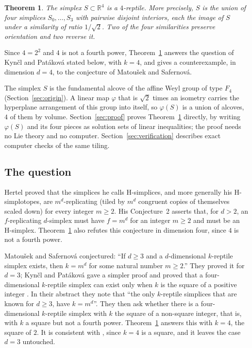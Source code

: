 \documentclass[11pt]{article}
\newtheorem{theorem}{Theorem}
\theoremstyle{remark}
\begin{document}
\begin{theorem}\label{thm:main}
The simplex $S\subset\mathbb{R}^4$ is a $4$-reptile. More precisely, $S$
is the union of four simplices $S_0,\dots,S_3$ with pairwise disjoint
interiors, each the image of $S$ under a similarity of ratio $1/\sqrt2$.
Two of the four similarities preserve orientation and two reverse it.
\end{theorem}

Since $4=2^2$ and $4$ is not a fourth power, Theorem~\ref{thm:main}
answers the question of Kynčl and Patáková stated below, with $k=4$, and
gives a counterexample, in dimension $d=4$, to the conjecture of Matoušek
and Safernová.

The simplex $S$ is the fundamental alcove of the affine Weyl group of type
$F_4$ (Section~\ref{sec:origin}). A linear map $\varphi$ that is $\sqrt2$
times an isometry carries the hyperplane arrangement of this group into
itself, so $\varphi(S)$ is a union of alcoves, $4$ of them by volume.
Section~\ref{sec:proof} proves Theorem~\ref{thm:main} directly, by
writing $\varphi(S)$ and its four pieces as solution sets of linear
inequalities; the proof needs no Lie theory and no computer.
Section~\ref{sec:verification} describes exact computer checks of the
same tiling.

\subsection{The question}
Hertel \cite[pp.~650--652]{He} proved that the simplices he calls
H-simplices, and more generally his H-simplotopes, are $m^d$-replicating
(tiled by $m^d$ congruent copies of themselves scaled down) for every
integer $m\ge2$. His Conjecture~2 \cite[p.~652]{He} asserts that, for
$d>2$, an $f$-replicating $d$-simplex must have $f=m^d$ for an integer
$m\ge2$ and must be an H-simplex. Theorem~\ref{thm:main} also refutes this
conjecture in dimension four, since $4$ is not a fourth power.

Matoušek and Safernová \cite[Conjecture~1.2]{MS} conjectured: ``If $d\ge3$
and a $d$-dimensional $k$-reptile simplex exists, then $k=m^d$ for some
natural number $m\ge2$.'' They proved it for $d=3$; Kynčl and Patáková
gave a simpler proof \cite[Theorem~1.2]{KP} and proved that a
four-dimensional $k$-reptile simplex can exist only when $k$ is the square
of a positive integer \cite[Theorem~1.3]{KP}. In
their abstract they note that ``the only $k$-reptile simplices that are
known for $d\geqslant3$, have $k=m^d$''. They then ask \cite[Problem~1.4;
Problem~2 in the arXiv version]{KP} whether there is a four-dimensional
$k$-reptile simplex with $k$ the square of a non-square integer, that is,
with $k$ a square but not a fourth power. Theorem~\ref{thm:main} answers
this with $k=4$, the square of $2$. It is consistent with \cite[Theorem~1.3]{KP}, since
$k=4$ is a square, and it leaves the case $d=3$ untouched.
\end{document}
